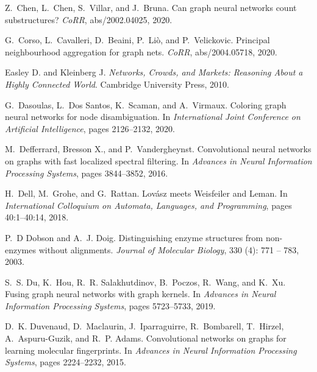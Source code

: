 \documentclass{article}
\theoremstyle{definition}
\begin{document}
\begin{thebibliography}{125}
	Z.~Chen, L.~Chen, S.~Villar, and J.~Bruna.
	\newblock Can graph neural networks count substructures?
	\newblock \emph{CoRR}, abs/2002.04025, 2020.
	
	G.~Corso, L.~Cavalleri, D.~Beaini, P.~Li{\`{o}}, and P.~Velickovic.
	\newblock Principal neighbourhood aggregation for graph nets.
	\newblock \emph{CoRR}, abs/2004.05718, 2020.
	
	Easley D. and Kleinberg J.
	\newblock \emph{Networks, Crowds, and Markets: Reasoning About a Highly
		Connected World}.
	\newblock Cambridge University Press, 2010.
	
	G.~Dasoulas, L.~Dos Santos, K.~Scaman, and A.~Virmaux.
	\newblock Coloring graph neural networks for node disambiguation.
	\newblock In \emph{International Joint Conference on Artificial Intelligence},
	pages 2126--2132, 2020.
	
	M.~Defferrard, Bresson X., and P.~Vandergheynst.
	\newblock Convolutional neural networks on graphs with fast localized spectral
	filtering.
	\newblock In \emph{Advances in Neural Information Processing Systems}, pages
	3844--3852, 2016.
	
	H.~Dell, M.~Grohe, and G.~Rattan.
	\newblock Lov{\'{a}}sz meets {W}eisfeiler and {L}eman.
	\newblock In \emph{International Colloquium on Automata, Languages, and
		Programming}, pages 40:1--40:14, 2018.
	
	P.~D Dobson and A.~J. Doig.
	\newblock Distinguishing enzyme structures from non-enzymes without alignments.
	\newblock \emph{Journal of Molecular Biology}, 330 (4): 771
	-- 783, 2003.
	
	S.~S. Du, K.~Hou, R.~R. Salakhutdinov, B.~Poczos, R.~Wang, and K.~Xu.
	 {F}using graph neural networks with
	graph kernels.
	\newblock In \emph{Advances in Neural Information Processing Systems}, pages
	5723--5733, 2019.
	
	D.~K. Duvenaud, D.~Maclaurin, J.~Iparraguirre, R.~Bombarell, T.~Hirzel,
	A.~Aspuru-Guzik, and R.~P. Adams.
	\newblock Convolutional networks on graphs for learning molecular fingerprints.
	\newblock In \emph{Advances in Neural Information Processing Systems}, pages
	2224--2232, 2015.
	

\end{thebibliography}
\end{document}
